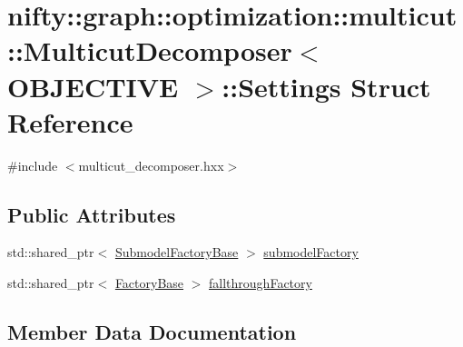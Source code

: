 \hypertarget{structnifty_1_1graph_1_1optimization_1_1multicut_1_1MulticutDecomposer_1_1Settings}{}\section{nifty\+:\+:graph\+:\+:optimization\+:\+:multicut\+:\+:Multicut\+Decomposer$<$ O\+B\+J\+E\+C\+T\+I\+V\+E $>$\+:\+:Settings Struct Reference}
\label{structnifty_1_1graph_1_1optimization_1_1multicut_1_1MulticutDecomposer_1_1Settings}


{\ttfamily \#include $<$multicut\+\_\+decomposer.\+hxx$>$}

\subsection*{Public Attributes}
\begin{DoxyCompactItemize}
\item 
std\+::shared\+\_\+ptr$<$ \hyperlink{classnifty_1_1graph_1_1optimization_1_1multicut_1_1MulticutDecomposer_aeaaa25324b05e31bf2b6e327e74e8b0e}{Submodel\+Factory\+Base} $>$ \hyperlink{structnifty_1_1graph_1_1optimization_1_1multicut_1_1MulticutDecomposer_1_1Settings_af75498fc46f891611d9ef84c20d6d89a}{submodel\+Factory}
\item 
std\+::shared\+\_\+ptr$<$ \hyperlink{classnifty_1_1graph_1_1optimization_1_1multicut_1_1MulticutDecomposer_ab73dd8e9719107245a263cfee74d0250}{Factory\+Base} $>$ \hyperlink{structnifty_1_1graph_1_1optimization_1_1multicut_1_1MulticutDecomposer_1_1Settings_a0144087ab258cf0ce0215bc517f02435}{fallthrough\+Factory}
\end{DoxyCompactItemize}


\subsection{Member Data Documentation}
\hypertarget{structnifty_1_1graph_1_1optimization_1_1multicut_1_1MulticutDecomposer_1_1Settings_a0144087ab258cf0ce0215bc517f02435}{}

